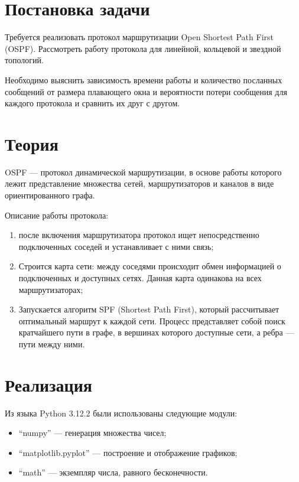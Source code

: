 \documentclass[a4paper,12pt]{article}
\begin{document}

\newpage

\tableofcontents
\listoffigures
\listoftables
\newpage

\section{Постановка задачи}
\quad Требуется реализовать протокол маршрутизации Open Shortest Path First
(OSPF). Рассмотреть работу протокола для линейной, кольцевой и звездной
топологий.

\quad Необходимо выяснить зависимость времени работы и количество посланных
сообщений от размера плавающего окна и вероятности потери сообщения для каждого
протокола и сравнить их друг с другом.

\section{Теория}
\quad OSPF --- протокол динамической маршрутизации, в основе работы которого
лежит представление множества сетей, маршрутизаторов и каналов в виде
ориентированного графа.

\quad Описание работы протокола:
\begin{enumerate}
  \item после включения маршрутизатора протокол ищет непосредственно
    подключенных соседей и устанавливает с ними связь;
  \item Строится карта сети: между соседями происходит обмен информацией о
    подключенных и доступных сетях. Данная карта одинакова на всех
    маршрутизаторах;
  \item Запускается алгоритм SPF (Shortest Path First), который рассчитывает
    оптимальный маршрут к каждой сети. Процесс представляет собой поиск
    кратчайшего пути в графе, в вершинах которого доступные сети, а ребра ---
    пути между ними.
\end{enumerate}

\section{Реализация}
\quad Из языка Python 3.12.2 были использованы следующие модули:
\begin{itemize}
  \item ``numpy'' --- генерация множества чисел;
  \item ``matplotlib.pyplot'' --- построение и отображение графиков;
  \item ``math'' --- экземпляр числа, равного бесконечности.
\end{itemize}
\end{document}
